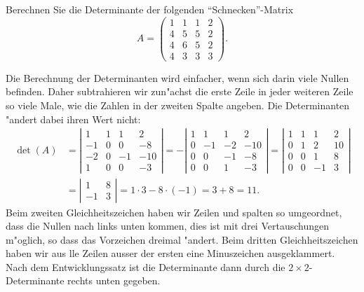 Berechnen Sie die Determinante der folgenden ``Schnecken''-Matrix
\[
A=
\begin{pmatrix}
1&1&1&2\\
4&5&5&2\\
4&6&5&2\\
4&3&3&3
\end{pmatrix}.
\]

\begin{loesung}
Die Berechnung der Determinanten wird einfacher, wenn sich darin viele
Nullen befinden.
Daher subtrahieren wir zun"achst die erste Zeile in jeder weiteren Zeile
so viele Male, wie die Zahlen in der zweiten Spalte angeben.
Die Determinanten "andert dabei ihren Wert nicht:
\begin{align*}
\det(A)
&=
\left|
\begin{matrix}
1&1&1&2\\
-1&0&0&-8\\
-2&0&-1&-10\\
1&0&0&-3
\end{matrix}\right|
=
-
\left|
\begin{matrix}
1& 1& 1&  2\\
0&-1&-2&-10\\
0& 0&-1& -8\\
0& 0& 1& -3
\end{matrix}\right|
=
\left|
\begin{matrix}
1& 1& 1&  2\\
0& 1& 2& 10\\
0& 0& 1&  8\\
0& 0&-1&  3
\end{matrix}\right|
\\
&=
\left|
\begin{matrix}
1&8\\-1&3
\end{matrix}\right|
=1\cdot 3-8\cdot(-1)=3+8=11.
\end{align*}
Beim zweiten Gleichheitszeichen haben wir Zeilen und spalten so umgeordnet,
dass die Nullen nach links unten kommen, dies ist mit drei Vertauschungen
m"oglich, so dass das Vorzeichen dreimal "andert.
Beim dritten Gleichheitszeichen haben wir aus lle Zeilen ausser der ersten
eine Minuszeichen ausgeklammert.
Nach dem Entwicklungssatz ist die Determinante dann durch die
$2\times 2$-Determinante rechts unten gegeben.
\end{loesung}

